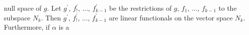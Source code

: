 null space of \(g\). Let \(g^{\prime}\), \(f^{\prime}_{!}\), \(\ldots\), \(f^{\prime}_{k-1}\) be the restrictions of \(g\), \(f_{1}\), \(\ldots\), \(f_{k-1}\) to the subspace \(N_{k}\). Then \(g^{\prime}\), \(f^{\prime}_{!}\), \(\ldots\), \(f^{\prime}_{k-1}\) are linear functionals on the vector space \(N_{k}\). Furthermore, if \(\alpha\) is a 